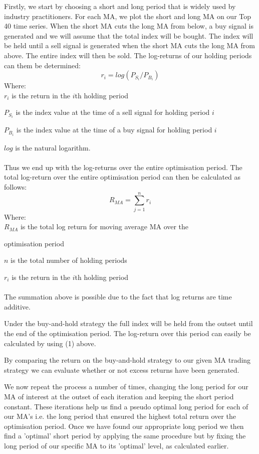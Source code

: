 \documentclass[12pt]{article}
\begin{document}
Firstly, we start by choosing a short and long period that is widely used by industry practitioners. For each MA, we plot the short and long MA on our Top 40 time series. When the short MA cuts the long MA from below, a buy signal is generated and we will assume that the total index will be bought. The index will be held until a sell signal is generated when the short MA cuts the long MA from above. The entire index will then be sold. The log-returns of our holding periods can them be determined: 
\begin{equation}
r_i=log(P_{S_i}/P_{B_i})
\end{equation}
Where: \\

$r_i$ is the return in the $i$th holding period

$P_{S_i}$ is the index value at the time of a sell signal for holding period $i$

$P_{B_i}$ is the index value at the time of a buy signal for holding period $i$

$log$ is the natural logarithm.\\
\noindent\\
Thus we end up with the log-returns over the entire optimisation period. The total log-return over the entire optimisation period can then be calculated as follows: 
\begin{equation}
R_{MA} = \sum_{j=1}^{n} r_i
\end{equation} 
Where:\\

$R_{MA}$ is the total log return for moving average MA over the

optimisation period

$n$ is the total number of holding periods

$r_i$ is the return in the $i$th holding period\\
\noindent\\
The summation above is possible due to the fact that log returns are time additive. 

Under the buy-and-hold strategy the full index will be held from the outset until the end of the optimisation period. The log-return over this period can easily be calculated by using (1) above. 

By comparing the return on the buy-and-hold strategy to our given MA trading strategy we can evaluate whether or not excess returns have been generated. 

We now repeat the process a number of times, changing the long period for our MA of interest at the outset of each iteration and keeping the short period constant. These iterations help us find a pseudo optimal long period for each of our MA's i.e. the long period that ensured the highest total return over the optimisation period. Once we have found our appropriate long period we then find a 'optimal' short period by applying the same procedure but by fixing the long period of our specific MA to its 'optimal' level, as calculated earlier. 
\end{document}
